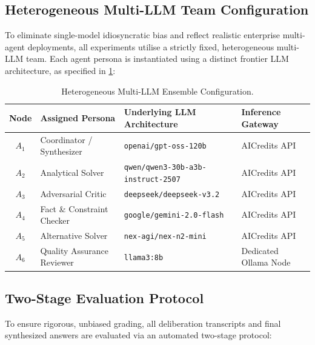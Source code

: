 \documentclass[conference]{IEEEtran}
\begin{document}
\subsection{Heterogeneous Multi-LLM Team Configuration}
\label{sec:team}

To eliminate single-model idiosyncratic bias and reflect realistic enterprise multi-agent deployments, all experiments utilise a strictly fixed, heterogeneous multi-LLM team. Each agent persona is instantiated using a distinct frontier LLM architecture, as specified in \cref{tab:agent_team}:

\begin{table}[t]
\centering
\caption{Heterogeneous Multi-LLM Ensemble Configuration.}
\label{tab:agent_team}
\begin{tabularx}{\textwidth}{c l >{\raggedright\arraybackslash}X l}
\toprule
\textbf{Node} & \textbf{Assigned Persona} & \textbf{Underlying LLM Architecture} & \textbf{Inference Gateway} \\
\midrule
$A_1$ & Coordinator / Synthesizer & \texttt{openai/gpt-oss-120b} & AICredits API \\
$A_2$ & Analytical Solver        & \texttt{qwen/qwen3-30b-a3b-instruct-2507} & AICredits API \\
$A_3$ & Adversarial Critic       & \texttt{deepseek/deepseek-v3.2} & AICredits API \\
$A_4$ & Fact \& Constraint Checker & \texttt{google/gemini-2.0-flash} & AICredits API \\
$A_5$ & Alternative Solver       & \texttt{nex-agi/nex-n2-mini} & AICredits API \\
$A_6$ & Quality Assurance Reviewer & \texttt{llama3:8b} & Dedicated Ollama Node \\
\bottomrule
\end{tabularx}
\end{table}

\subsection{Two-Stage Evaluation Protocol}
\label{sec:eval_protocol}

To ensure rigorous, unbiased grading, all deliberation transcripts and final synthesized answers are evaluated via an automated two-stage protocol:
\end{document}
